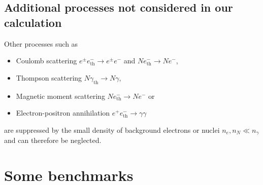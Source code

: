 \documentclass[11pt,a4paper]{article}
\newcommand{\eq}[1]{#1}
\begin{document}
\subsection*{Additional processes not considered in our calculation}
Other processes such as
\begin{itemize}
	\item Coulomb scattering $e^\pm e^-_\text{th} \rightarrow e^\pm e^-$ and $N e^-_\text{th} \rightarrow N e^-$,
	\item Thompson scattering $N \gamma_\text{th} \rightarrow N \gamma$,
	\item Magnetic moment scattering $N e^-_\text{th} \rightarrow N e^-$ or
	\item Electron-positron annihilation $e^+ e^-_\text{th} \rightarrow \gamma \gamma$
\end{itemize}
are suppressed by the small density of background electrons or nuclei  $\eq{n}_{e}, n_N \ll \eq{n}_{\gamma}$ and can therefore be neglected.


\section{Some benchmarks}
\label{sec:benchmarks_single}
\end{document}
